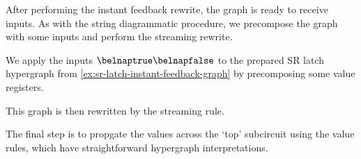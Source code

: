 After performing the instant feedback rewrite, the graph is ready to receive
inputs.
As with the string diagrammatic procedure, we precompose the graph with some
inputs and perform the streaming rewrite.

\begin{example}\label{ex:sr-latch-streaming-graph}
    We apply the inputs \(\belnaptrue\belnapfalse\) to the prepared SR latch
    hypergraph from \cref{ex:sr-latch-instant-feedback-graph} by precomposing
    some value registers.
    \begin{center}
    \end{center}
    This graph is then rewritten by the streaming rule.
    \begin{center}
        \vspace{-1em}
    \end{center}
\end{example}

The final step is to propgate the values across the `top' subcircuit using the
value rules, which have straightforward hypergraph interpretations.

\begin{center}
    
    \quad
    
    \\
    
    \quad
    \raisebox{0.6em}{}
\end{center}


